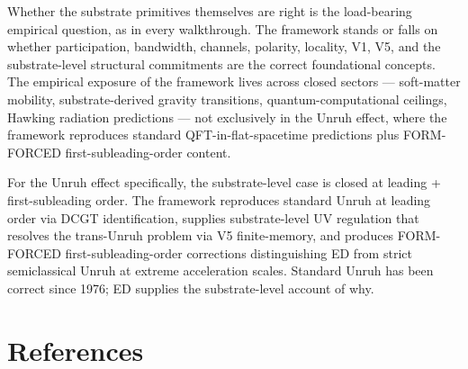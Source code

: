 \documentclass[11pt,a4paper]{article}
\begin{document}
Whether the substrate primitives themselves are right is the load-bearing empirical question, as in every walkthrough. The framework stands or falls on whether participation, bandwidth, channels, polarity, locality, V1, V5, and the substrate-level structural commitments are the correct foundational concepts. The empirical exposure of the framework lives across closed sectors --- soft-matter mobility, substrate-derived gravity transitions, quantum-computational ceilings, Hawking radiation predictions --- not exclusively in the Unruh effect, where the framework reproduces standard QFT-in-flat-spacetime predictions plus FORM-FORCED first-subleading-order content.

For the Unruh effect specifically, the substrate-level case is closed at leading + first-subleading order. The framework reproduces standard Unruh at leading order via DCGT identification, supplies substrate-level UV regulation that resolves the trans-Unruh problem via V5 finite-memory, and produces FORM-FORCED first-subleading-order corrections distinguishing ED from strict semiclassical Unruh at extreme acceleration scales. Standard Unruh has been correct since 1976; ED supplies the substrate-level account of why.

\section{References}
\end{document}
